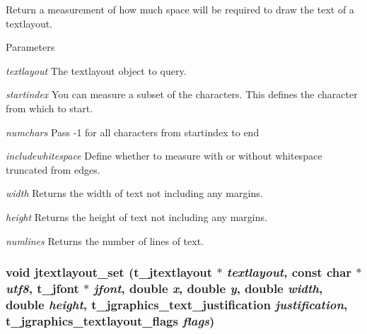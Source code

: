 Return a measurement of how much space will be required to draw the text of a textlayout. 
\begin{DoxyParams}{Parameters}
\item[{\em textlayout}]The textlayout object to query. \item[{\em startindex}]You can measure a subset of the characters. This defines the character from which to start. \item[{\em numchars}]Pass -\/1 for all characters from startindex to end \item[{\em includewhitespace}]Define whether to measure with or without whitespace truncated from edges. \item[{\em width}]Returns the width of text not including any margins. \item[{\em height}]Returns the height of text not including any margins. \item[{\em numlines}]Returns the number of lines of text. \end{DoxyParams}
\hypertarget{group__textlayout_gac9d7684376b82def890308ca2ab7ff9e}{
\subsubsection[{jtextlayout\_\-set}]{\setlength{\rightskip}{0pt plus 5cm}void jtextlayout\_\-set ({\bf t\_\-jtextlayout} $\ast$ {\em textlayout}, \/  const char $\ast$ {\em utf8}, \/  {\bf t\_\-jfont} $\ast$ {\em jfont}, \/  double {\em x}, \/  double {\em y}, \/  double {\em width}, \/  double {\em height}, \/  {\bf t\_\-jgraphics\_\-text\_\-justification} {\em justification}, \/  {\bf t\_\-jgraphics\_\-textlayout\_\-flags} {\em flags})}}
\label{group__textlayout_gac9d7684376b82def890308ca2ab7ff9e}


